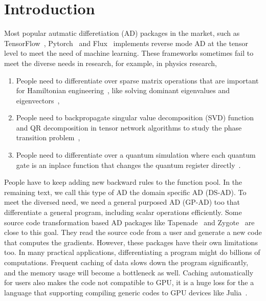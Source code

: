 \documentclass{article}
\newcommand{\<}{\langle}
\renewcommand{\>}{\rangle}
\theoremstyle{definition}\newtheorem{definition}{\textit{Definition}}
\begin{document}
\section{Introduction}\label{sec:intro}
    Most popular autmatic differetiation (AD) packages in the market, such as TensorFlow~\cite{Tensorflow2015}, Pytorch~\cite{Paszke2017} and Flux~\cite{Innes2018a} implements reverse mode AD at the tensor level to meet the need of machine learning. These frameworks sometimes fail to meet the diverse needs in research, for example, in physics research,
    \begin{enumerate}
        \item People need to differentiate over sparse matrix operations that are important for Hamiltonian engineering~\cite{Xie2020}, like solving dominant eigenvalues and eigenvectors~\cite{Golub2012},
        \item People need to backpropagate singular value decomposition (SVD) function and QR decomposition in tensor network algorithms to study the phase transition problem~\cite{Golub2012,Liao2019,Seeger2017,Wan2019,Hubig2019},
        \item People need to differentiate over a quantum simulation where each quantum gate is an inplace function that changes the quantum register directly~\cite{Luo2019}.
    \end{enumerate}
People have to keep adding new backward rules to the function pool. In the remaining text, we call this type of AD the domain specific AD (DS-AD). 
To meet the diversed need, we need a general purposed AD (GP-AD) too that differentiate a general program, including scalar operations efficiently.
Some source code transformation based AD packages like Tapenade~\cite{Hascoet2013} and Zygote~\cite{Innes2018, Innes2019} are close to this goal.
They read the source code from a user and generate a new code that computes the gradients. However, these packages have their own limitations too. In many practical applications, differentiating a program might do billions of computations. Frequent caching of data slows down the program significantly, and the memory usage will become a bottleneck as well. Caching automatically for users also makes the code not compatible to GPU, it is a huge loss for the a language that supporting compiling generic codes to GPU devices like Julia~\cite{Bezanson2012,Bezanson2017}.
\end{document}
